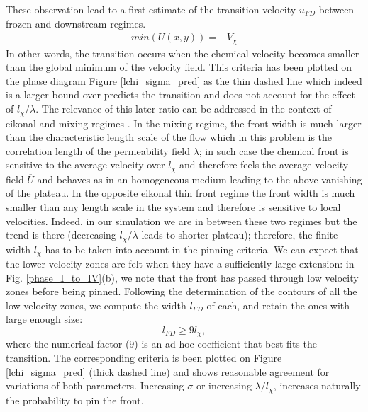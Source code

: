 \documentclass[doublecol]{epl2}
\begin{document}
These observation lead to a first estimate of the transition velocity $u_{FD}$ between frozen and downstream regimes.
\begin{eqnarray}
min(U(x,y)) = -V_{\chi}
\end{eqnarray}
In other words, the transition occurs when the chemical velocity becomes smaller than the global minimum of the velocity field.
This criteria has been plotted on the phase diagram Figure \ref{lchi_sigma_pred} as the thin dashed line which indeed is a larger bound over predicts the transition and does not account for the effect of $l_\chi/\lambda$.
The relevance of this later ratio can be addressed in the context of eikonal \cite{williams85} and mixing regimes \cite{edwards02,leconte04}. In the mixing regime, the front width is much larger than the characteristic length scale of the flow which in this problem is the correlation length of the permeability field $\lambda$; in such case the chemical front is sensitive to the average velocity over $l_{\chi}$ and therefore feels the average velocity field $\overline{U}$ and behaves as in an homogeneous medium leading to the above vanishing of the plateau. In the opposite eikonal thin front regime the front width is much smaller than any length scale in the system and therefore is sensitive to local velocities.
Indeed, in our simulation we are in between these two regimes but the trend is there (decreasing $l_\chi/\lambda$ leads to shorter plateau); therefore,  the finite width $l_{\chi}$ has to be taken into account in the pinning criteria. We can expect that the lower velocity zones are felt when they have a sufficiently large extension: in Fig. \ref{phase_I_to_IV}(b), we note that the front has passed through low velocity zones before being pinned. Following the determination of the contours of all the low-velocity zones, we compute the width $l_{FD}$ of each, and retain the ones with large enough size:
\begin{equation}
l_{FD}  \geq 9 l_\chi,
\label{lst}
\end{equation}
where the numerical factor ($9$) is an ad-hoc coefficient that best fits the transition.
The corresponding criteria is been plotted on Figure \ref{lchi_sigma_pred} (thick dashed line) and shows reasonable agreement for variations of both parameters.
Increasing $\sigma$ or increasing $\lambda/l_{\chi}$, increases naturally the probability to pin the front.\\
\end{document}
